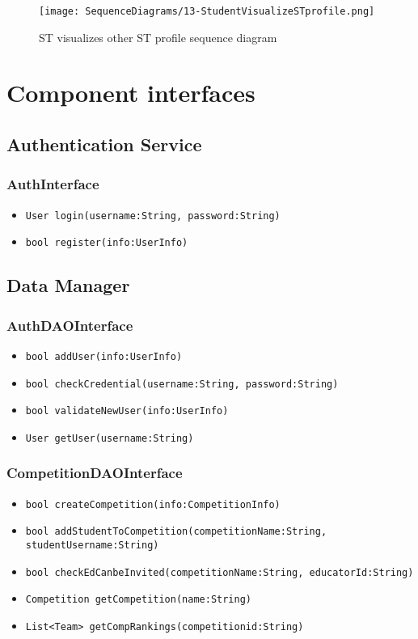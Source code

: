 \begin{figure}[H]
  \centering
  \texttt{[image: SequenceDiagrams/13-StudentVisualizeSTprofile.png]}
  \caption{ST visualizes other ST profile sequence diagram}
  \label{fig:st_visualizes_other_st_profile}
\end{figure}

\section{Component interfaces}
\label{s:component-interfaces}%


\subsection{Authentication Service}
\subsubsection{AuthInterface}
\begin{itemize}
    \item \texttt{User login(username:String, password:String)}%
    \item \texttt{bool register(info:UserInfo)} %
\end{itemize}

\subsection{Data Manager}
\subsubsection{AuthDAOInterface}
\begin{itemize}
    \item \texttt{bool addUser(info:UserInfo)}%
    \item \texttt{bool checkCredential(username:String, password:String)}%
    \item \texttt{bool validateNewUser(info:UserInfo)}%
    \item \texttt{User getUser(username:String)}%
\end{itemize}

\subsubsection{CompetitionDAOInterface}
\begin{itemize}
    \item \texttt{bool createCompetition(info:CompetitionInfo)}
    \item \texttt{bool addStudentToCompetition(competitionName:String, studentUsername:String)}
    \item \texttt{bool checkEdCanbeInvited(competitionName:String, educatorId:String)}%
    \item \texttt{Competition getCompetition(name:String)}%
    \item \texttt{List<Team> getCompRankings(competitionid:String)}
\end{itemize}

